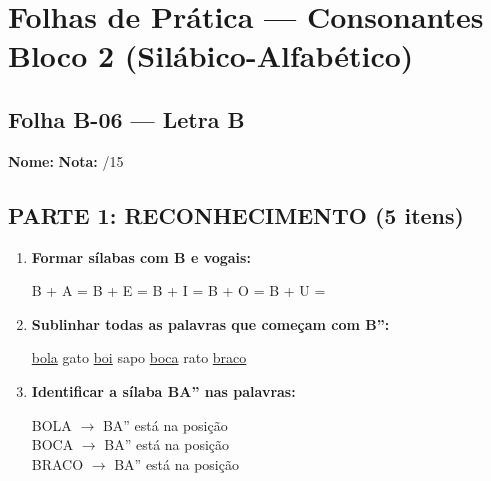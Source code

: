 
\section{Folhas de Prática --- Consonantes Bloco 2 (Silábico-Alfabético)}


\subsection{Folha B-06 --- Letra B}

\begin{exercicio}

\noindent\textbf{Nome:} \underline{\hspace{4cm}} \quad \textbf{Nota:} \underline{\hspace{1cm}}/15

\subsection*{PARTE 1: RECONHECIMENTO (5 itens)}

\begin{enumerate}
  \item \textbf{Formar sílabas com B e vogais:}
  \begin{center}
  B + A = \underline{\hspace{1.5cm}} \quad B + E = \underline{\hspace{1.5cm}} \quad B + I = \underline{\hspace{1.5cm}} \quad B + O = \underline{\hspace{1.5cm}} \quad B + U = \underline{\hspace{1.5cm}}
  \end{center}

  \item \textbf{Sublinhar todas as palavras que começam com B'':}
  \begin{center}
  \uline{bola} \quad gato \quad \uline{boi} \quad sapo \quad \uline{boca} \quad rato \quad \uline{braco}
  \end{center}

  \item \textbf{Identificar a sílaba BA'' nas palavras:}
  \begin{center}
  BOLA $\rightarrow$ BA'' está na posição \underline{\hspace{1cm}} \\
  BOCA $\rightarrow$ BA'' está na posição \underline{\hspace{1cm}} \\
  BRACO $\rightarrow$ BA'' está na posição \underline{\hspace{1cm}}
  \end{center}


\end{enumerate}
\end{exercicio}
